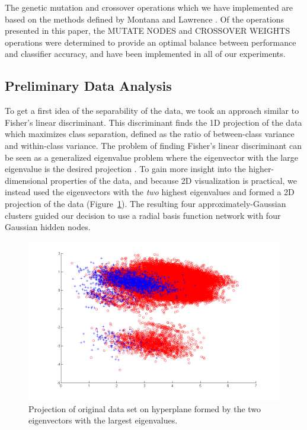 \documentclass[11pt]{article}       %
\begin{document}
The genetic mutation and crossover operations which we have implemented are based on the methods defined by Montana and Lawrence \cite{GA-ANN}. Of the operations presented in this paper, the MUTATE NODES and CROSSOVER WEIGHTS operations were determined to provide an optimal balance between performance and classifier accuracy, and have been implemented in all of our experiments.

\subsection{Preliminary Data Analysis} \label{prelim}
To get a first idea of the separability of the data, we took an approach similar to Fisher's linear discriminant. This discriminant finds the 1D projection of the data which maximizes class separation, defined as the ratio of between-class variance and within-class variance. The problem of finding Fisher's linear discriminant can be seen as a generalized eigenvalue problem where the eigenvector with the large eigenvalue is the desired projection \cite[\S 3.8.2]{Duda}.
To gain more insight into the higher-dimensional properties of the data, and because 2D visualization is practical, we instead used the eigenvectors with the \emph{two} highest eigenvalues and formed a 2D projection of the data (Figure~\ref{fig:fishers-2d}). The resulting four approximately-Gaussian clusters guided our decision to use a radial basis function network with four Gaussian hidden nodes.

\begin{figure}[h]
	\centering
	\includegraphics[width=\textwidth]{fishers_2d}
	\caption{Projection of original data set on hyperplane formed by the two eigenvectors with the largest eigenvalues.}
	\label{fig:fishers-2d}
\end{figure}
\end{document}
